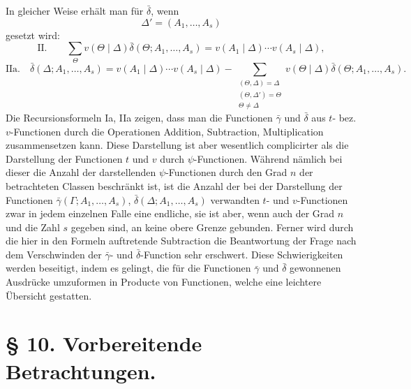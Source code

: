 \documentclass[11pt,a4paper]{article}
\begin{document}
In gleicher Weise erhält man für $\bar\delta$, wenn
\[
 \Delta'=(A_1,\ldots,A_s)
\]
gesetzt wird:
\[
\text{II.}\qquad
 \sum_{\Theta}v(\Theta\mid\Delta)\bar\delta(\Theta;A_1,\ldots,A_s)
 =v(A_1\mid\Delta)\cdots v(A_s\mid\Delta),
\]
\[
\text{IIa.}\quad
 \bar\delta(\Delta;A_1,\ldots,A_s)=v(A_1\mid\Delta)\cdots v(A_s\mid\Delta)
 -\sum_{\substack{(\Theta,\Delta)=\Delta\\(\Theta,\Delta')=\Theta\\\Theta\ne\Delta}}
 v(\Theta\mid\Delta)\bar\delta(\Theta;A_1,\ldots,A_s).
\]
Die Recursionsformeln Ia, IIa zeigen, dass man die Functionen $\bar\gamma$ und $\bar\delta$ aus $t$- bez. $v$-Functionen durch die Operationen Addition, Subtraction, Multiplication zusammensetzen kann. Diese Darstellung ist aber wesentlich complicirter als die Darstellung der Functionen $t$ und $v$ durch $\psi$-Functionen. Während nämlich bei dieser die Anzahl der darstellenden $\psi$-Functionen durch den Grad $n$ der betrachteten Classen beschränkt ist, ist die Anzahl der bei der Darstellung der Functionen $\bar\gamma(\Gamma;A_1,\ldots,A_s)$, $\bar\delta(\Delta;A_1,\ldots,A_s)$ verwandten $t$- und $v$-Functionen zwar in jedem einzelnen Falle eine endliche, sie ist aber, wenn auch der Grad $n$ und die Zahl $s$ gegeben sind, an keine obere Grenze gebunden. Ferner wird durch die hier in den Formeln auftretende Subtraction die Beantwortung der Frage nach dem Verschwinden der $\bar\gamma$- und $\bar\delta$-Function sehr erschwert. Diese Schwierigkeiten werden beseitigt, indem es gelingt, die für die Functionen $\bar\gamma$ und $\bar\delta$ gewonnenen Ausdrücke umzuformen in Producte von Functionen, welche eine leichtere Übersicht gestatten.

\section*{§ 10. Vorbereitende Betrachtungen.}
\end{document}
